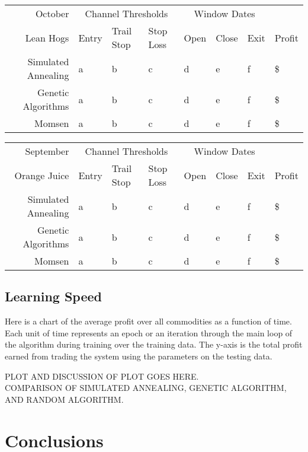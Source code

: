 \documentclass[10pt]{article}
\begin{document}
\begin{tabular}{|r|l|l|l|l|l|l|l|}
  \hline
  October & \multicolumn{3}{|c|}{Channel Thresholds} & \multicolumn{3}{|c|}{Window Dates} &  \\
  Lean Hogs & Entry & Trail Stop & Stop Loss & Open & Close & Exit & Profit\\ \hline
  Simulated Annealing & a & b & c & d & e & f & \$ \\ \hline
  Genetic Algorithms & a & b & c & d & e & f & \$ \\ \hline
  Momsen &  a & b & c & d & e & f & \$ \\ \hline
\end{tabular}

\begin{tabular}{|r|l|l|l|l|l|l|l|}
  \hline
  September    & \multicolumn{3}{|c|}{Channel Thresholds} & \multicolumn{3}{|c|}{Window Dates} &  \\
  Orange Juice & Entry & Trail Stop & Stop Loss & Open & Close & Exit & Profit\\ \hline
  Simulated Annealing & a & b & c & d & e & f & \$ \\ \hline
  Genetic Algorithms & a & b & c & d & e & f & \$ \\ \hline
  Momsen &  a & b & c & d & e & f & \$ \\ \hline
\end{tabular}

\subsection{Learning Speed}

Here is a chart of the average profit over all commodities as a function of
time.  Each unit of time represents an epoch or an iteration through the main
loop of the algorithm during training over the training data.  The y-axis is the
total profit earned from trading the system using the parameters on the testing
data.

PLOT AND DISCUSSION OF PLOT GOES HERE.\\
COMPARISON OF SIMULATED ANNEALING, GENETIC ALGORITHM, AND RANDOM ALGORITHM.\\

\section{Conclusions}



%
%
\end{document}
